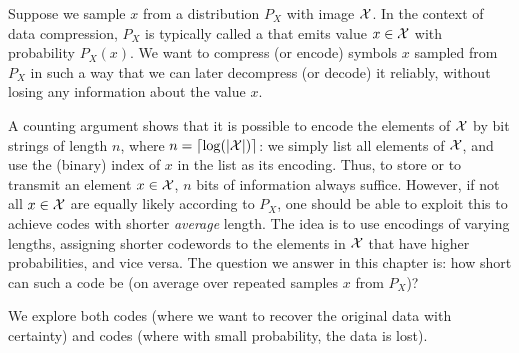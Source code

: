 Suppose we sample $x$ from a distribution $P_X$ with image $\cal
X$. In the context of data compression, $P_X$ is typically called a
 that emits value $x \in {\cal X}$ with probability
$P_X(x)$. We want to compress (or encode) symbols $x$ sampled from
$P_X$ in such a way that we can later decompress (or decode) it reliably, without losing any information about the value $x$.

\begin{figure}[h]
\begin{center}
\end{center}
\end{figure}

\noindent A counting argument shows that it is possible to encode the
elements of ${\cal X}$ by bit strings of length $n$, where $n=\lceil
\log (|{\cal X}|) \rceil $: we simply list all elements of ${\cal X}$,
and use the (binary) index of $x$ in the list as its encoding. 
Thus, to store or to transmit an element $x\in {\cal X}$, $n$ bits
of information always suffice. However, if not all $x \in \cal X$ are equally likely according to $P_X$, one should be able to
exploit this to achieve codes with shorter {\em average} length. The idea is to use encodings of varying lengths, assigning shorter codewords to the elements in ${\cal X}$ that have higher probabilities, and vice versa.
The question we answer in this chapter is: how short can such a code be (on average over repeated samples $x$ from $P_X$)?

We explore both  codes (where we want to recover the original data with certainty) and  codes (where with small probability, the data is lost).


